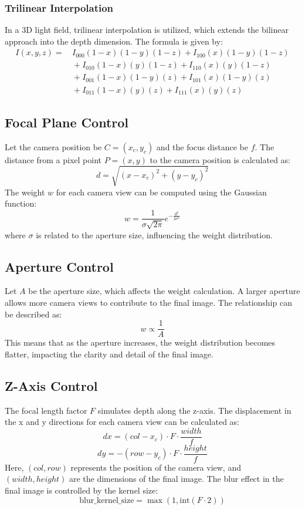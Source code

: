 \documentclass{article}
\begin{document}
\subsubsection{Trilinear Interpolation}
In a 3D light field, trilinear interpolation is utilized, which extends the bilinear approach into the depth dimension. The formula is given by:
\begin{align*}
    I(x, y, z) = & \, I_{000}(1-x)(1-y)(1-z) + I_{100}(x)(1-y)(1-z)\\
                  & \, + I_{010}(1-x)(y)(1-z) + I_{110}(x)(y)(1-z) \\
                  & \, + I_{001}(1-x)(1-y)(z) + I_{101}(x)(1-y)(z) \\
                  & \, + I_{011}(1-x)(y)(z) + I_{111}(x)(y)(z)
    \end{align*}
    

\subsection{Focal Plane Control}
Let the camera position be \( C = (x_c, y_c) \) and the focus distance be \( f \). The distance from a pixel point \( P = (x, y) \) to the camera position is calculated as:
\[
d = \sqrt{(x - x_c)^2 + (y - y_c)^2}
\]
The weight \( w \) for each camera view can be computed using the Gaussian function:
\[
w = \frac{1}{\sigma \sqrt{2\pi}} e^{-\frac{d^2}{2\sigma^2}}
\]
where \( \sigma \) is related to the aperture size, influencing the weight distribution.

\subsection{Aperture Control}
Let \( A \) be the aperture size, which affects the weight calculation. A larger aperture allows more camera views to contribute to the final image. The relationship can be described as:
\[
w \propto \frac{1}{A}
\]
This means that as the aperture increases, the weight distribution becomes flatter, impacting the clarity and detail of the final image.

\subsection{Z-Axis Control}
The focal length factor \( F \) simulates depth along the z-axis. The displacement in the x and y directions for each camera view can be calculated as:
\[
dx = (col - x_c) \cdot F \cdot \frac{width}{f}
\]
\[
dy = -(row - y_c) \cdot F \cdot \frac{height}{f}
\]
Here, \( (col, row) \) represents the position of the camera view, and \( (width, height) \) are the dimensions of the final image. The blur effect in the final image is controlled by the kernel size:
\[
\text{blur\_kernel\_size} = \max(1, \text{int}(F \cdot 2))
\]
\end{document}
